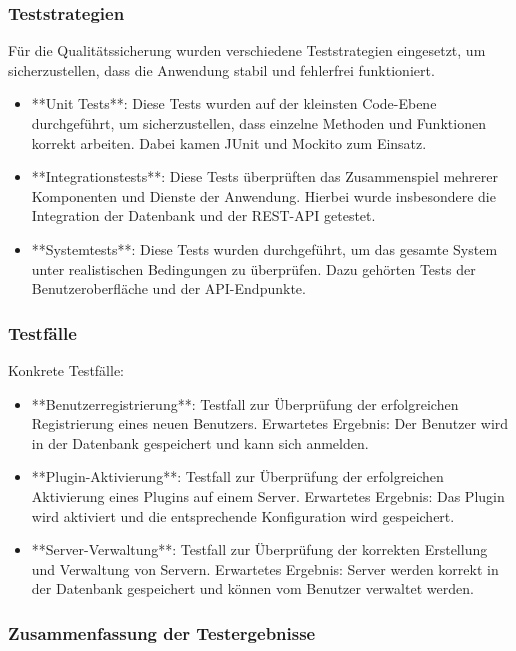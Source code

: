 \subsubsection{Teststrategien}\label{teststrategien}

Für die Qualitätssicherung wurden verschiedene Teststrategien eingesetzt, um sicherzustellen, dass die Anwendung stabil und fehlerfrei funktioniert.

\begin{itemize}
  \item
        **Unit Tests**: Diese Tests wurden auf der kleinsten Code-Ebene durchgeführt, um sicherzustellen, dass einzelne Methoden und Funktionen korrekt arbeiten. Dabei kamen JUnit und Mockito zum Einsatz.
  \item
        **Integrationstests**: Diese Tests überprüften das Zusammenspiel mehrerer Komponenten und Dienste der Anwendung. Hierbei wurde insbesondere die Integration der Datenbank und der REST-API getestet.
  \item
        **Systemtests**: Diese Tests wurden durchgeführt, um das gesamte System unter realistischen Bedingungen zu überprüfen. Dazu gehörten Tests der Benutzeroberfläche und der API-Endpunkte.
\end{itemize}

\subsubsection{Testfälle}\label{testfuxe4lle}

Konkrete Testfälle:

\begin{itemize}
  \item
        **Benutzerregistrierung**: Testfall zur Überprüfung der erfolgreichen Registrierung eines neuen Benutzers. Erwartetes Ergebnis: Der Benutzer wird in der Datenbank gespeichert und kann sich anmelden.
  \item
        **Plugin-Aktivierung**: Testfall zur Überprüfung der erfolgreichen Aktivierung eines Plugins auf einem Server. Erwartetes Ergebnis: Das Plugin wird aktiviert und die entsprechende Konfiguration wird gespeichert.
  \item
        **Server-Verwaltung**: Testfall zur Überprüfung der korrekten Erstellung und Verwaltung von Servern. Erwartetes Ergebnis: Server werden korrekt in der Datenbank gespeichert und können vom Benutzer verwaltet werden.
\end{itemize}

\subsubsection{Zusammenfassung der Testergebnisse}

